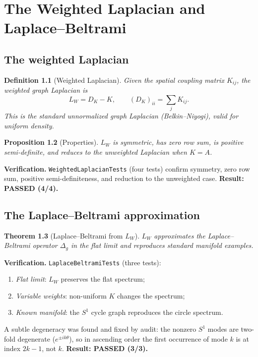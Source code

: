 \documentclass[11pt,twoside]{book}
\newtheorem{theorem}{Theorem}[chapter]
\newtheorem{proposition}[theorem]{Proposition}
\newtheorem{definition}[theorem]{Definition}
\begin{document}

\chapter{The Weighted Laplacian and Laplace--Beltrami}
\label{ch:laplace-beltrami}

\section{The weighted Laplacian}

\begin{definition}[Weighted Laplacian]
Given the spatial coupling matrix $K_{ij}$, the weighted graph Laplacian is
\begin{equation}
L_W = D_K - K,
\qquad (D_K)_{ii} = \sum_j K_{ij}.
\end{equation}
This is the standard \emph{unnormalized} graph Laplacian (Belkin--Niyogi), valid for
uniform density.
\end{definition}

\begin{proposition}[Properties]
$L_W$ is symmetric, has zero row sum, is positive semi-definite, and reduces to the
unweighted Laplacian when $K=A$.
\end{proposition}

\textbf{Verification.} \texttt{WeightedLaplacianTests} (four tests) confirm symmetry, zero
row sum, positive semi-definiteness, and reduction to the unweighted case.
\textbf{Result: PASSED (4/4).}

\section{The Laplace--Beltrami approximation}

\begin{theorem}[Laplace--Beltrami from $L_W$]
$L_W$ approximates the Laplace--Beltrami operator $\Delta_g$ in the flat limit and
reproduces standard manifold examples.
\end{theorem}

\textbf{Verification.} \texttt{LaplaceBeltramiTests} (three tests):
\begin{enumerate}
\item \emph{Flat limit}: $L_W$ preserves the flat spectrum;
\item \emph{Variable weights}: non-uniform $K$ changes the spectrum;
\item \emph{Known manifold}: the $S^1$ cycle graph reproduces the circle spectrum.
\end{enumerate}
A subtle degeneracy was found and fixed by audit: the nonzero $S^1$ modes are two-fold
degenerate ($e^{\pm ik\theta}$), so in ascending order the first occurrence of mode $k$ is
at index $2k-1$, not $k$. \textbf{Result: PASSED (3/3).}
\end{document}
